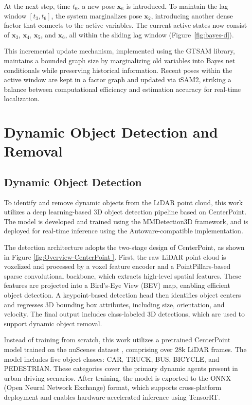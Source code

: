 At the next step, time \( t_6 \), a new pose \( \mathbf{x}_6 \) is introduced. To maintain the lag window \( [t_3, t_6] \), the system marginalizes pose \( \mathbf{x}_2 \), introducing another dense factor that connects to the active variables. The current active states now consist of \( \mathbf{x}_3 \), \( \mathbf{x}_4 \), \( \mathbf{x}_5 \), and \( \mathbf{x}_6 \), all within the sliding lag window (Figure~\ref{fig:bayes-d}).

This incremental update mechanism, implemented using the GTSAM library, maintains a bounded graph size by marginalizing old variables into Bayes net conditionals while preserving historical information. Recent poses within the active window are kept in a factor graph and updated via iSAM2, striking a balance between computational efficiency and estimation accuracy for real-time localization.


\section{Dynamic Object Detection and Removal}

\subsection{Dynamic Object Detection}

To identify and remove dynamic objects from the LiDAR point cloud, this work utilizes a deep learning-based 3D object detection pipeline based on CenterPoint\cite{yin2021center}. The model is developed and trained using the MMDetection3D framework\cite{mmdet3d2020}, and is deployed for real-time inference using the Autoware-compatible implementation\cite{autoware_universe}.

The detection architecture adopts the two-stage design of CenterPoint\cite{yin2021center}, as shown in Figure \ref{fig:Overview-CenterPoint }. First, the raw LiDAR point cloud is voxelized and processed by a voxel feature encoder and a PointPillars-based sparse convolutional backbone\cite{lang2019pointpillars}, which extracts high-level spatial features. These features are projected into a Bird’s-Eye View (BEV) map, enabling efficient object detection. A keypoint-based detection head then identifies object centers and regresses 3D bounding box attributes, including size, orientation, and velocity. The final output includes class-labeled 3D detections, which are used to support dynamic object removal.

Instead of training from scratch, this work utilizes a pretrained CenterPoint model trained on the nuScenes dataset \cite{caesar2020nuscenes}, comprising over 28k LiDAR frames. The model includes five object classes: CAR, TRUCK, BUS, BICYCLE, and PEDESTRIAN. These categories cover the primary dynamic agents present in urban driving scenarios. After training, the model is exported to the ONNX (Open Neural Network Exchange) format, which supports cross-platform deployment and enables hardware-accelerated inference using TensorRT.




